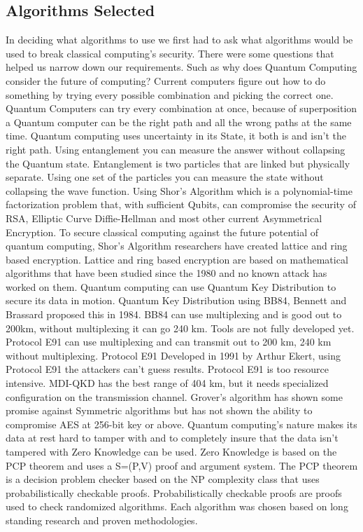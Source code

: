 \documentclass[sigconf]{acmart}
\begin{document}
\subsection{Algorithms Selected}
In deciding what algorithms to use we first had to ask what algorithms would be used to break classical computing’s security. There were some questions that helped us narrow down our requirements. Such as why does Quantum Computing consider the future of computing?  Current computers figure out how to do something by trying every possible combination and picking the correct one. Quantum Computers can try every combination at once, because of superposition a Quantum computer can be the right path and all the wrong paths at the same time. Quantum computing uses uncertainty in its State, it both is and isn’t the right path. Using entanglement you can measure the answer without collapsing the Quantum state. Entanglement is two particles that are linked but physically separate. Using one set of the particles you can measure the state without collapsing the wave function. Using Shor’s Algorithm which is a polynomial-time factorization problem that, with sufficient Qubits, can compromise the security of RSA, Elliptic Curve Diffie-Hellman and most other current Asymmetrical Encryption. To secure classical computing against the future potential of quantum computing, Shor’s Algorithm researchers have created lattice and ring based encryption. Lattice and ring based encryption are based on mathematical algorithms that have been studied since the 1980 and no known attack has worked on them. Quantum computing can use Quantum Key Distribution to secure its data in motion. Quantum Key Distribution using BB84, Bennett and Brassard proposed this in 1984. BB84 can use multiplexing and is good out to 200km, without multiplexing it can go 240 km. Tools are not fully developed yet. Protocol E91 can use multiplexing and can transmit out to 200 km, 240 km without multiplexing. Protocol E91 Developed in 1991 by Arthur Ekert, using Protocol E91 the attackers can’t guess results. Protocol E91 is too resource intensive. MDI-QKD has the best range of 404 km, but it needs specialized configuration on the transmission channel. Grover’s algorithm has shown some promise against Symmetric algorithms but has not shown the ability to compromise AES at 256-bit key or above. Quantum computing’s nature makes its data at rest hard to tamper with and to completely insure that the data isn’t tampered with Zero Knowledge can be used. Zero Knowledge is based on the PCP theorem and uses a S=(P,V) proof and argument system. The PCP theorem is a decision problem checker based on the NP complexity class that uses probabilistically checkable proofs. Probabilistically checkable proofs are proofs used to check randomized algorithms. Each algorithm was chosen based on long standing research and proven methodologies.
\end{document}
